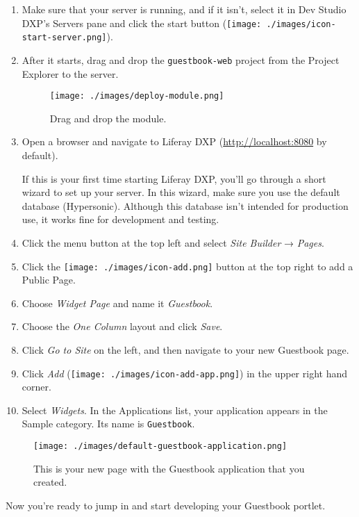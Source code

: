 \begin{enumerate}
\def\labelenumi{\arabic{enumi}.}
\item
  Make sure that your server is running, and if it isn't, select it in
  Dev Studio DXP's Servers pane and click the start button
  (\texttt{[image: ./images/icon-start-server.png]}).
\item
  After it starts, drag and drop the \texttt{guestbook-web} project from
  the Project Explorer to the server.

  \begin{figure}
  \centering
  \texttt{[image: ./images/deploy-module.png]}
  \caption{Drag and drop the module.}
  \end{figure}
\item
  Open a browser and navigate to Liferay DXP
  (\url{http://localhost:8080} by default).

  If this is your first time starting Liferay DXP, you'll go through a
  short wizard to set up your server. In this wizard, make sure you use
  the default database (Hypersonic). Although this database isn't
  intended for production use, it works fine for development and
  testing.
\item
  Click the menu button at the top left and select \emph{Site Builder} →
  \emph{Pages}.
\item
  Click the \texttt{[image: ./images/icon-add.png]} button at the top
  right to add a Public Page.
\item
  Choose \emph{Widget Page} and name it \emph{Guestbook}.
\item
  Choose the \emph{One Column} layout and click \emph{Save}.
\item
  Click \emph{Go to Site} on the left, and then navigate to your new
  Guestbook page.
\item
  Click \emph{Add} (\texttt{[image: ./images/icon-add-app.png]}) in the
  upper right hand corner.
\item
  Select \emph{Widgets}. In the Applications list, your application
  appears in the Sample category. Its name is \texttt{Guestbook}.
\end{enumerate}

\begin{figure}
\centering
\texttt{[image: ./images/default-guestbook-application.png]}
\caption{This is your new page with the Guestbook application that you
created.}
\end{figure}

Now you're ready to jump in and start developing your Guestbook portlet.

